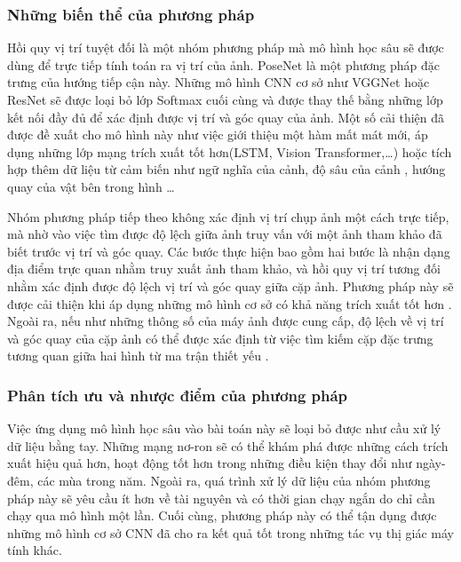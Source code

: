 \subsubsection*{Những biến thể của phương pháp}

Hồi quy vị trí tuyệt đối là một nhóm phương pháp mà mô hình học sâu sẽ được dùng để trực tiếp tính toán ra vị trí của ảnh. PoseNet \cite{kendall2016posenet} là một phương pháp đặc trưng của hướng tiếp cận này. Những mô hình CNN cơ sở như VGGNet hoặc ResNet sẽ được loại bỏ lớp Softmax cuối cùng và được thay thế bằng những lớp kết nối đầy đủ để xác định được vị trí và góc quay của ảnh. Một số cải thiện đã được đề xuất cho mô hình này như việc giới thiệu một hàm mất mát mới, áp dụng những lớp mạng trích xuất tốt hơn(LSTM, Vision Transformer,\dots) \cite{keetha2023anyloc} hoặc tích hợp thêm dữ liệu từ cảm biến như ngữ nghĩa của cảnh, độ sâu của cảnh \cite{yan2022crossloc}, hướng quay của vật bên trong hình \cite{liu2019lending} \dots

Nhóm phương pháp tiếp theo không xác định vị trí chụp ảnh một cách trực tiếp, mà nhờ vào việc tìm được độ lệch giữa ảnh truy vấn với một ảnh tham khảo đã biết trước vị trí và góc quay. Các bước thực hiện bao gồm hai bước là nhận dạng địa điểm trực quan nhằm truy xuất ảnh tham khảo, và hồi quy vị trí tương đối nhằm xác định được độ lệch vị trí và góc quay giữa cặp ảnh. Phương pháp này sẽ được cải thiện khi áp dụng những mô hình cơ sở có khả năng trích xuất tốt hơn \cite{shavit2023coarse}. Ngoài ra, nếu như những thông số của máy ảnh được cung cấp, độ lệch về vị trí và góc quay của cặp ảnh có thể được xác định từ việc tìm kiếm cặp đặc trưng tương quan giữa hai hình từ ma trận thiết yếu \cite{zhou2020learn}.

\subsubsection*{Phân tích ưu và nhược điểm của phương pháp}
Việc ứng dụng mô hình học sâu vào bài toán này sẽ loại bỏ được như cầu xử lý dữ liệu bằng tay. Những mạng nơ-ron sẽ có thể khám phá được những cách trích xuất hiệu quả hơn, hoạt động tốt hơn trong những điều kiện thay đổi như ngày-đêm, các mùa trong năm. Ngoài ra, quá trình xử lý dữ liệu của nhóm phương pháp này sẽ yêu cầu ít hơn về tài nguyên và có thời gian chạy ngắn do chỉ cần chạy qua mô hình một lần. Cuối cùng, phương pháp này có thể tận dụng được những mô hình cơ sở CNN đã cho ra kết quả tốt trong những tác vụ thị giác máy tính khác.

